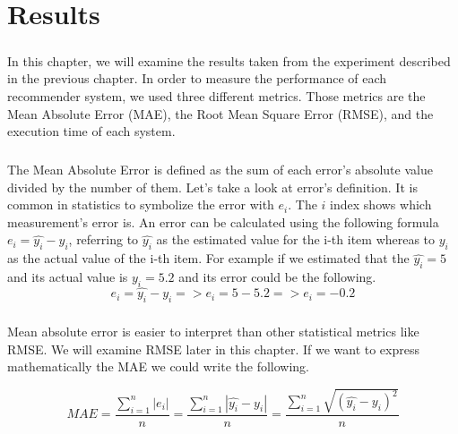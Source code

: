 \newpage
\chapter{Results}

\paragraph{} In this chapter, we will examine the results taken from the experiment described in the previous chapter. 
In order to measure the performance of each recommender system, we used three different metrics. Those metrics are the Mean Absolute Error (MAE), the Root Mean Square Error (RMSE), and the execution time of each system.

\paragraph{} The Mean Absolute Error is defined as the sum of each error's absolute value divided by the number of them. Let's take a look
at error's definition. It is common in statistics to symbolize the error with $e_i$. The $i$ index shows which measurement's error is. An error can be calculated using the following formula $e_i = \widehat{y_i} - y_i$, referring to $\widehat{y_{i}}$ as the estimated value for the i-th item whereas to $y_i$ as the actual value of the i-th item. For example if we estimated that the $\widehat{y_i} = 5$ and its actual value is $y_i = 5.2$ and its error could be the following.
\begin{equation}
e_i = \widehat{y_i} - y_i => e_i = 5 - 5.2  => e_i = -0.2
\end{equation}

\paragraph{} Mean absolute error is easier to interpret than other statistical metrics like RMSE. We will examine RMSE later in this chapter. If we want to express mathematically the MAE we could write the following.

\begin{equation}
MAE = \frac{\sum_{i=1}^{n}{|e_i|}}{n} =
\frac{\sum_{i=1}^{n}{|\widehat{y_{i}}-y_{i}|} }{n} =
\frac{\sum_{i=1}^{n}\sqrt{{(\widehat{y_{i}}-y_{i})}^{2}}}{n}
\end{equation}

